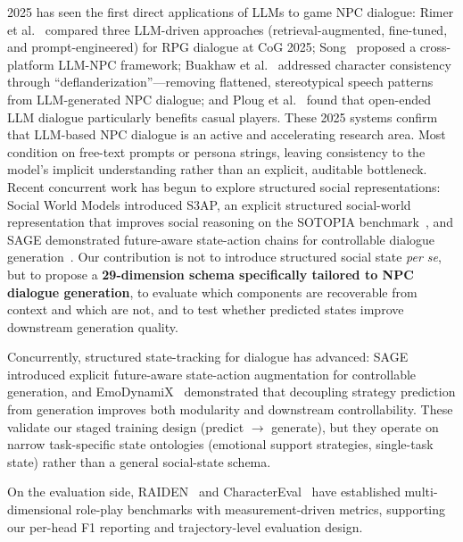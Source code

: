 \documentclass[11pt]{article}
\begin{document}
2025 has seen the first direct applications of LLMs to game NPC dialogue: Rimer et al.~\cite{rimer2025talking} compared three LLM-driven approaches (retrieval-augmented, fine-tuned, and prompt-engineered) for RPG dialogue at CoG 2025; Song~\cite{song2025llmnpc} proposed a cross-platform LLM-NPC framework; Buakhaw et al.~\cite{buakhaw2025deflanderization} addressed character consistency through ``deflanderization''---removing flattened, stereotypical speech patterns from LLM-generated NPC dialogue; and Ploug et al.~\cite{ploug2025open} found that open-ended LLM dialogue particularly benefits casual players.
These 2025 systems confirm that LLM-based NPC dialogue is an active and accelerating research area.
Most condition on free-text prompts or persona strings, leaving consistency to the model's implicit understanding rather than an explicit, auditable bottleneck.
Recent concurrent work has begun to explore structured social representations: Social World Models introduced S3AP, an explicit structured social-world representation that improves social reasoning on the SOTOPIA benchmark~\cite{zhou2024sotopia,zhou2025social}, and SAGE demonstrated future-aware state-action chains for controllable dialogue generation~\cite{sage2025steering}.
Our contribution is not to introduce structured social state \textit{per se}, but to propose a \textbf{29-dimension schema specifically tailored to NPC dialogue generation}, to evaluate which components are recoverable from context and which are not, and to test whether predicted states improve downstream generation quality.

Concurrently, structured state-tracking for dialogue has advanced: SAGE~\cite{sage2025steering} introduced explicit future-aware state-action augmentation for controllable generation, and EmoDynamiX~\cite{emodynamix2025naacl} demonstrated that decoupling strategy prediction from generation improves both modularity and downstream controllability.
These validate our staged training design (predict $\rightarrow$ generate), but they operate on narrow task-specific state ontologies (emotional support strategies, single-task state) rather than a general social-state schema.

On the evaluation side, RAIDEN~\cite{raiden2025coling} and CharacterEval~\cite{charactereval2024acl} have established multi-dimensional role-play benchmarks with measurement-driven metrics, supporting our per-head F1 reporting and trajectory-level evaluation design.
\end{document}

